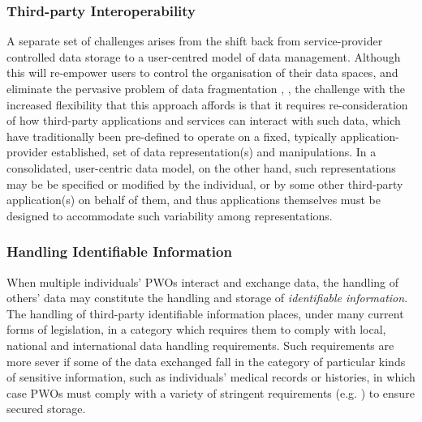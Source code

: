 \documentclass[letterpaper]{sig-alternate}
\begin{document}
\subsubsection{Third-party Interoperability}

A separate set of challenges arises from the shift back from service-provider controlled data storage to a user-centred model of data management. Although this will re-empower users to control the organisation of their data spaces, and eliminate the pervasive problem of data fragmentation \cite{karger2006data}, \cite{heath2011linked}, the challenge with the increased flexibility that this approach affords is that it requires re-consideration of how third-party applications and services can interact with such data, which have traditionally been pre-defined to operate on a fixed, typically application-provider established, set of data representation(s) and manipulations.  In a consolidated, user-centric data model, on the other hand, such representations may be be specified or modified by the individual, or by some other third-party application(s) on behalf of them, and thus applications themselves must be designed to accommodate such variability among representations.

\subsubsection{Handling Identifiable Information}

When multiple individuals' PWOs interact and exchange data, the handling of others' data may constitute the handling and storage of \emph{identifiable information}\cite{narayanan2010myths}. The handling of third-party identifiable information places, under many current forms of legislation, in a category which requires them to comply with local, national and international data handling requirements. Such requirements are more sever if some of the data exchanged fall in the category of particular kinds of sensitive information, such as individuals' medical records or histories, in which case PWOs must comply with a variety of stringent requirements (e.g. \cite{banisar1999global}) to ensure secured storage.  

\end{document}
